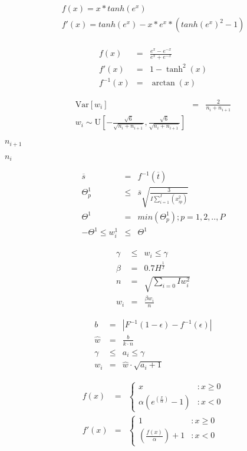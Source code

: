 \documentclass{article}
\begin{document}
\begin{eqnarray*} f(x) = x * tanh(e^x)\\ f'(x) = tanh(e^x) - x*e^x*(tanh(e^x)^2 - 1)\\ \end{eqnarray*}
\pagebreak

\begin{eqnarray*} f(x) &=& \frac{e^x - e^{-x}}{e^x + e^{-x}} \\ f'(x) &=& 1 - \tanh^2(x) \\ f^{-1}(x) &=& \arctan(x) \end{eqnarray*}
\pagebreak

\begin{eqnarray*} \mathrm{Var}[w_i] &=& \frac{2}{n_i + n_{i+1}} \\ w_i \sim \mathrm{U}[-\frac{\sqrt{6}}{\sqrt{n_i + n_{i+1}}}, \frac{\sqrt{6}}{\sqrt{n_i + n_{i+1}}}] \end{eqnarray*}
\pagebreak

$ n_{i+1} $
\pagebreak

$ n_i $
\pagebreak

\begin{eqnarray*} \overline{s} &=& f^{-1}(\overline{t}) \\ \Theta^{1}_{p} &\le& \overline{s} \sqrt{\frac{3}{I \sum_{i = 1}^{I} (x_{ip}^2)}} \\ \Theta^1 &=& min(\Theta_{p}^{1}); p=1,2,..,P \\ -\Theta^{1} \le w_{i}^{1} &\le& \Theta^{1} \end{eqnarray*}
\pagebreak

\begin{eqnarray*} \gamma &\le& w_i \le \gamma \\ \beta &=& 0.7H^{\frac{1}{I}} \\ n &=& \sqrt{\sum_{i=0}{I}w_{i}^{2}} \\ w_i &=& \frac{\beta w_i}{n} \end{eqnarray*}
\pagebreak

\begin{eqnarray*} b &=& |F^{-1}(1 - \epsilon) - f^{-1}(\epsilon)| \\ \hat{w} &=& \frac{b}{k \cdot n} \\ \gamma &\le& a_i \le \gamma \\ w_i &=& \hat{w} \cdot \sqrt{a_i + 1} \end{eqnarray*}
\pagebreak

\begin{eqnarray*} f(x) &=& \left\{ \begin{array}{lr} x & : x \ge 0 \\ \alpha(e^(\frac{x}{\alpha}) - 1) & : x < 0 \end{array} \right. \\ f'(x) &=& \left\{ \begin{array}{lr} 1 & : x \ge 0 \\ (\frac{f(x)}{\alpha}) + 1 & : x < 0 \end{array} \right. \end{eqnarray*}
\pagebreak
\end{document}
